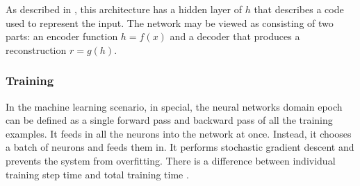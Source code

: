 As described in \cite{yang2020feedback}, this architecture has a hidden layer of $h$ that describes a code used to represent the input. The network may be viewed as consisting of two parts: an encoder function $h=f(x)$ and a decoder that produces a reconstruction $r=g(h)$.

\subsubsection{Training}

In the machine learning scenario, in special, the neural networks domain epoch can be defined as a single forward pass and backward pass of all the training examples. It feeds in all the neurons into the network at once. Instead, it chooses a batch of neurons and feeds them in. It performs stochastic gradient descent and prevents the system from overfitting. There is a difference between individual training step time and total training time \cite{pascanu2013difficulty}. 


